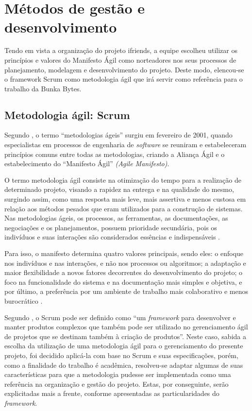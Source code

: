 \section{Métodos de gestão e desenvolvimento}

Tendo em vista a organização do projeto \gls{ifriends}, a equipe escolheu utilizar os princípios e valores do Manifesto Ágil como norteadores nos seus processos de planejamento, modelagem e desenvolvimento do projeto. Deste modo, elencou-se  o \gls{framework} Scrum como metodologia ágil que irá servir como referência para o trabalho da Bunka Bytes.

\subsection{Metodologia ágil: Scrum} 
Segundo , o termo “metodologias ágeis” surgiu em fevereiro de 2001, quando  especialistas em processos de engenharia de \textsl{software} se reuniram e estabeleceram princípios comuns entre todas as metodologias, criando a Aliança Ágil e o estabelecimento do ``Manifesto Ágil'' \textsl{(Agile Manifesto)}.

O termo metodologia ágil consiste na otimização do tempo para a realização de determinado projeto, visando a rapidez na entrega e na qualidade do mesmo, surgindo assim, como uma resposta mais leve, mais assertiva e menos custosa em relação aos métodos pesados que eram utilizados para a construção de sistemas. Nas metodologias ágeis, os processos, as ferramentas, as documentações, as negociações e os planejamentos, possuem prioridade secundária, pois os indivíduos e suas interações são considerados essências e indispensáveis \cite{sganderla2016aprimorando}.

Para isso, o manifesto determina quatro valores principais, sendo eles: o enfoque nos indivíduos e nas interações, e não nos processos ou algoritmos; a adaptação e maior flexibilidade a novos fatores decorrentes do desenvolvimento do projeto; o foco na funcionalidade do sistema e na documentação mais simples e objetiva, e por último, a preferência por um ambiente de trabalho mais colaborativo e menos burocrático  \cite{sganderla2016aprimorando}. 

Segundo , o Scrum pode ser definido como ``um \textsl{\gls{framework}} para desenvolver e manter produtos complexos que também pode ser utilizado no gerenciamento ágil de projetos que se destinam também à criação de produtos''. Neste caso, sabida a escolha da utilização de uma metodologia ágil para o gerenciamento do presente projeto, foi decidido aplicá-la com base no Scrum e suas especificações, porém, como a finalidade do trabalho é acadêmica, resolveu-se adaptar algumas de suas características para que a metodologia pudesse ser implementada como uma referência na organização e gestão do projeto. Estas, por conseguinte, serão explicitadas mais a frente, conforme apresentadas as particularidades do \textsl{\gls{framework}}.


